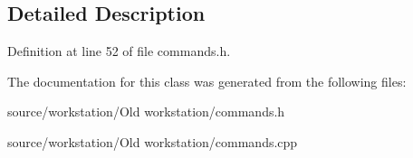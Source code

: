 \subsection{Detailed Description}


Definition at line 52 of file commands.\-h.



The documentation for this class was generated from the following files\-:\begin{DoxyCompactItemize}
\item 
source/workstation/\-Old workstation/commands.\-h\item 
source/workstation/\-Old workstation/commands.\-cpp\end{DoxyCompactItemize}
